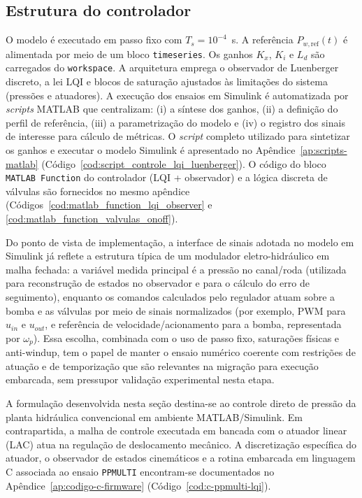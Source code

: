 \subsection{Estrutura do controlador}
\label{sec:estrutura-controlador-simulink}
O modelo é executado em passo fixo com $T_s=10^{-4}$~s. A referência $P_{w,\text{ref}}(t)$ é alimentada por meio de um bloco \texttt{timeseries}. Os ganhos $K_x$, $K_i$ e $L_d$ são carregados do \texttt{workspace}. A arquitetura emprega o observador de Luenberger discreto, a lei LQI e blocos de saturação ajustados às limitações do sistema (pressões e atuadores). A execução dos ensaios em Simulink é automatizada por \textit{scripts} MATLAB que centralizam: (i) a síntese dos ganhos, (ii) a definição do perfil de referência, (iii) a parametrização do modelo e (iv) o registro dos sinais de interesse para cálculo de métricas. O \textit{script} completo utilizado para sintetizar os ganhos e executar o modelo Simulink é apresentado no Apêndice~\ref{ap:scripts-matlab} (Código~\ref{cod:script_controle_lqi_luenberger}). O código do bloco \texttt{MATLAB Function} do controlador (LQI + observador) e a lógica discreta de válvulas são fornecidos no mesmo apêndice (Códigos~\ref{cod:matlab_function_lqi_observer} e \ref{cod:matlab_function_valvulas_onoff}).

Do ponto de vista de implementação, a interface de sinais adotada no modelo em Simulink já reflete a estrutura típica de um modulador eletro-hidráulico em malha fechada: a variável medida principal é a pressão no canal/roda (utilizada para reconstrução de estados no observador e para o cálculo do erro de seguimento), enquanto os comandos calculados pelo regulador atuam sobre a bomba e as válvulas por meio de sinais normalizados (por exemplo, \gls{PWM} para $u_{in}$ e $u_{out}$, e referência de velocidade/acionamento para a bomba, representada por $\omega_p$). Essa escolha, combinada com o uso de passo fixo, saturações físicas e anti-windup, tem o papel de manter o ensaio numérico coerente com restrições de atuação e de temporização que são relevantes na migração para execução embarcada, sem pressupor validação experimental nesta etapa.

A formulação desenvolvida nesta seção destina-se ao controle direto de pressão da planta hidráulica convencional em ambiente MATLAB/Simulink. Em contrapartida, a malha de controle executada em bancada com o atuador linear (LAC) atua na regulação de deslocamento mecânico. A discretização específica do atuador, o observador de estados cinemáticos e a rotina embarcada em linguagem C associada ao ensaio \texttt{PPMULTI} encontram-se documentados no Apêndice~\ref{ap:codigo-c-firmware} (Código~\ref{cod:c-ppmulti-lqi}).

